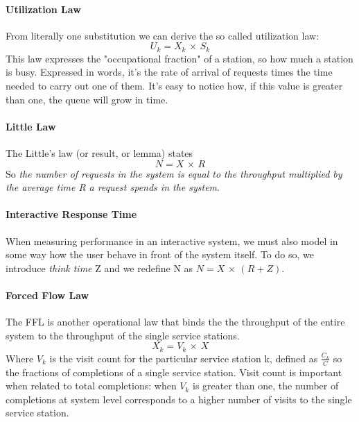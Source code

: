 \documentclass[10pt,a4paper]{article}
\begin{document}
				\paragraph{Utilization Law}
					From literally one substitution we can derive the so called utilization law:
					\begin{equation}
						U_k = X_k \,\times\, S_k
					\end{equation} 
					This law expresses the "occupational fraction" of a station, so how much a station is busy. Expressed in words, it's the rate of arrival of requests times the time needed to carry out one of them. It's easy to notice how, if this value is greater than one, the queue will grow in time.
					
				\paragraph{Little Law}
					The Little's law (or result, or lemma) states
					\begin{equation}
						N = X \,\times\,R
					\end{equation}
					So \emph{the number of requests in the system is equal to the throughput multiplied by the average time R a request spends in the system}.
					
				\paragraph{Interactive Response Time}
					When measuring performance in an interactive system, we must also model in some way how the user behave in front of the system itself. To do so, we introduce \emph{think time} Z and we redefine N as $N = X \,\times\, (R + Z) $.

				\paragraph{Forced Flow Law}
					The FFL is another operational law that binds the the throughput of the entire system to the throughput of the single service stations.
					\begin{equation}
						X_k = V_k \,\times\, X
					\end{equation}
					Where $V_k$ is the visit count for the particular service station k, defined as $\frac{C_k}{C}$ so the fractions of completions of a single service station. Visit count is important when related to total completions: when $V_k$ is greater than one, the number of completions at system level corresponds to a higher number of visits to the single service station.\\
					
\end{document}
